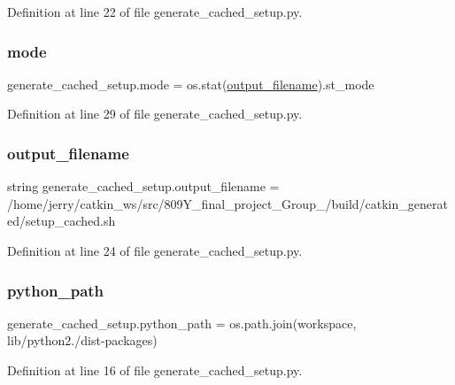 Definition at line 22 of file generate\+\_\+cached\+\_\+setup.\+py.

\mbox{\label{namespacegenerate__cached__setup_a10081e5abedae9bd46dd91202096e789}} 
\subsubsection{\texorpdfstring{mode}{mode}}
{\footnotesize\ttfamily generate\+\_\+cached\+\_\+setup.\+mode = os.\+stat(\hyperlink{namespacegenerate__cached__setup_a0265aee5075ee1eb701ff69c98ad6793}{output\+\_\+filename}).st\+\_\+mode}



Definition at line 29 of file generate\+\_\+cached\+\_\+setup.\+py.

\mbox{\label{namespacegenerate__cached__setup_a0265aee5075ee1eb701ff69c98ad6793}} 
\subsubsection{\texorpdfstring{output\+\_\+filename}{output\_filename}}
{\footnotesize\ttfamily string generate\+\_\+cached\+\_\+setup.\+output\+\_\+filename = \textquotesingle{}/home/jerry/catkin\+\_\+ws/src/809\+Y\+\_\+final\+\_\+project\+\_\+\+Group\+\_/build/catkin\+\_\+generated/setup\+\_\+cached.\+sh\textquotesingle{}}



Definition at line 24 of file generate\+\_\+cached\+\_\+setup.\+py.

\mbox{\label{namespacegenerate__cached__setup_a72579fd01529a79bab20d99291889d3f}} 
\subsubsection{\texorpdfstring{python\+\_\+path}{python\_path}}
{\footnotesize\ttfamily generate\+\_\+cached\+\_\+setup.\+python\+\_\+path = os.\+path.\+join(workspace, \textquotesingle{}lib/python2./dist-\/packages\textquotesingle{})}



Definition at line 16 of file generate\+\_\+cached\+\_\+setup.\+py.

